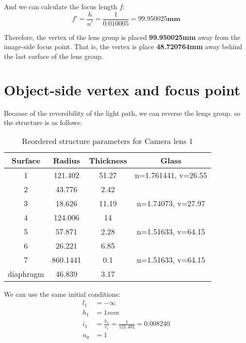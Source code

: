 \documentclass{article}
\begin{document}
And we can calculate the focus length $f$:
\begin{equation*}
    \boxed{
        f' = \frac{h}{u'} = \frac{1}{0.010005} =99.950025\mathbf{mm}
    }
\end{equation*}

Therefore, the vertex of the lens group is placed \textbf{99.950025mm} away from the image-side focus point. That is, the vertex is place \textbf{48.720764mm} away behind the last surface of the lens group.

\section{Object-side vertex and focus point}

Because of the reversibility of the light path, we can  reverse the lengs group. so the structure is as follows:

\begin{table}[H]
    \centering
    \begin{tabular}{cccc}
        \hline
        \textbf{Surface} & \textbf{Radius} & \textbf{Thickness} & \textbf{Glass}      \\
        \hline
        1                & 121.402         & 51.27              & n=1.761441, v=26.55 \\
        2                & 43.776          & 2.42               &                     \\
        3                & 18.626          & 11.19              & n=1.74073, v=27.97  \\
        4                & 124.006         & 14                 &                     \\
        5                & 57.871          & 2.28               & n=1.51633, v=64.15  \\
        6                & 26.221          & 6.85               &                     \\
        7                & 860.1441        & 0.1                & n=1.51633, v=64.15  \\
        diaphragm        & 46.839          & 3.17               &                     \\
        \hline
    \end{tabular}
    \caption{Reordered structure parameters for Camera lens 1}
    \label{tab:camera1_reversed}
\end{table}

We can use the same initial conditions:
\begin{align*}
    l_1 & = -\infty                                   \\
    h_1 & =1mm                                        \\
    i_1 & =\frac{h_1}{r_1}=\frac{1}{121.402}=0.008240 \\
    n_0 & = 1
\end{align*}
\end{document}

